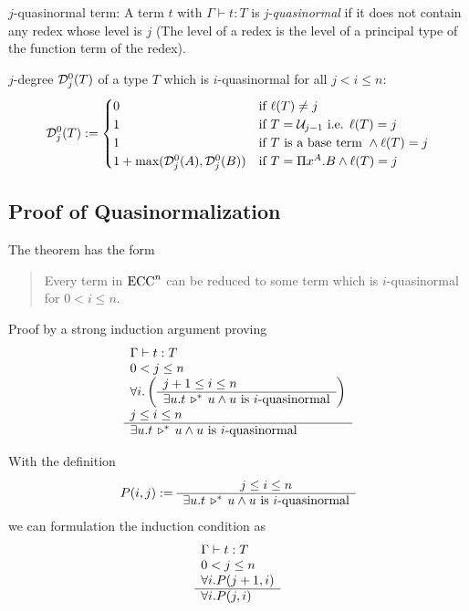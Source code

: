 \begin{definition}
  $j$-quasinormal term:
  A term $t$ with $\Gamma \vdash t : T$ is \emph{j-quasinormal} if it does not
  contain any redex whose level is $j$ (The level of a redex is the level of
  a principal type of the function term of the redex).
\end{definition}

\begin{definition}
  $j$-degree ${\cal D}^0_j(T)$  of a type $T$ which is $i$-quasinormal for all
  $j < i \le n$:
  $$
  {\cal D}^0_j(T) :=
  \begin{cases}
    0 & \text{if } \ell(T) \not= j
    \\
    1 & \text{if } T = {\cal U}_{j-1} \text{ i.e. } \ell(T) = j
    \\
    1 & \text{if $T$ is a base term } \land \ell(T) = j
    \\
    1 + \text{max}({\cal D}^0_j(A), {\cal D}^0_j(B)) &
    \text{if } T = \Pi x^A.B \land \ell(T) = j
  \end{cases}
  $$
\end{definition}



\subsection{Proof of Quasinormalization}

The theorem has the form
\begin{quote}
  Every term in $\text{ECC}^n$ can be reduced to some term which is $i$-quasinormal
  for $0 < i \le n$.
\end{quote}


Proof by a strong induction argument proving
$$
\begin{array}{l} 
  \Gamma \vdash t : T
  \\
  0 < j \le n
  \\
  \forall i.
  \left(
    \begin{array}{l} j+1 \le i \le n \\ \hline \exists u. t \,\triangleright^*\, u \land u \text{ is $i$-quasinormal}\end{array}
  \right)
  \\
  j \le i \le n
 \\ \hline 
  \exists u. t \,\triangleright^*\, u \land u \text{ is $i$-quasinormal}
\end{array}
$$

With the definition
$$
P(i,j) :=
\begin{array}{c} j \le i \le n \\ \hline \exists u. t \,\triangleright^*\, u \land u \text{ is $i$-quasinormal}\end{array}
$$
%
we can formulation the induction condition as
$$
\begin{array}{l} 
  \Gamma \vdash t : T
  \\
  0 < j \le n
  \\
  \forall i. P(j+1,i)
 \\ \hline 
  \forall i. P(j,i)
\end{array}
$$



